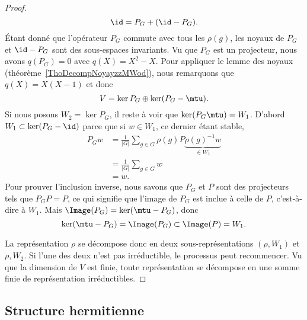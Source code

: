 \begin{proof}
    \begin{equation}
        \id=P_G+(\id-P_G).
    \end{equation}
    Étant donné que l'opérateur \( P_G\) commute avec tous les \( \rho(g)\), les noyaux de \( P_G\) et \( \id-P_G\) sont des sous-espaces invariants. Vu que \( P_G\) est un projecteur, nous avons \( q(P_G)=0\) avec \( q(X)=X^2-X\). Pour appliquer le lemme des noyaux (théorème~\ref{ThoDecompNoyayzzMWod}), nous remarquons que \( q(X)=X(X-1)\) et donc
    \begin{equation}
        V=\ker P_G\oplus\ker(P_G-\mtu).
    \end{equation}
    Si nous posons \( W_2=\ker P_G\), il reste à voir que \( \ker(P_G\mtu)=W_1\). D'abord \( W_1\subset\ker(P_G-\id)\) parce que si \( w\in W_1\), ce dernier étant stable,
    \begin{subequations}
        \begin{align}
            P_Gw&=\frac{1}{ | G | }\sum_{g\in G}\rho(g)P\underbrace{\rho(g)^{-1}w}_{\in W_1}\\
            &=\frac{1}{ | G | }\sum_{g\in G}w\\
            &=w.
        \end{align}
    \end{subequations}
    Pour prouver l'inclusion inverse, nous savons que \( P_G\) et \( P\) sont des projecteurs tels que \( P_GP=P\), ce qui signifie que l'image de \( P_G\) est inclue à celle de \( P\), c'est-à-dire à \( W_1\). Mais \( \Image(P_G)=\ker(\mtu-P_G)\), donc
    \begin{equation}
        \ker(\mtu-P_G)=\Image(P_G)\subset\Image(P)=W_1.
    \end{equation}

    La représentation \( \rho\) se décompose donc en deux sous-représentations \( (\rho,W_1)\) et \( \rho,W_2\). Si l'une des deux n'est pas irréductible, le processus peut recommencer. Vu que la dimension de \( V\) est finie, toute représentation se décompose en une somme finie de représentation irréductibles.
\end{proof}

\subsection{Structure hermitienne}

